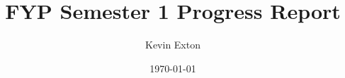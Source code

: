 \documentclass[11pt, a4paper, draft]{report}
\title{FYP Semester 1 Progress Report}
\author{Kevin Exton}
\date{\today}
\begin{document}
\maketitle
\renewcommand{\abstractname}{Executive Summary}
\begin{abstract}
	
\end{abstract}
\newpage


\end{document}
